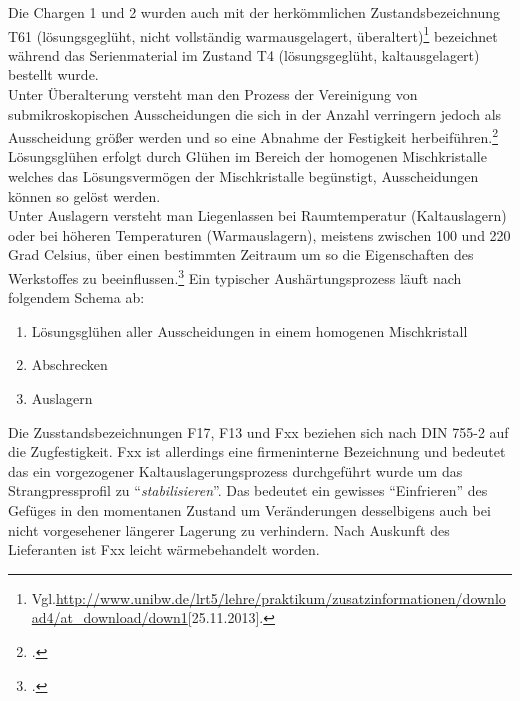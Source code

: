 \documentclass[12pt,a4paper,parskip]{scrartcl}
\begin{document}
 Die Chargen 1 und 2 wurden auch mit der herkömmlichen Zustandsbezeichnung T61 (lösungsgeglüht, nicht vollständig warmausgelagert, überaltert)\footnote{Vgl.\url{http://www.unibw.de/lrt5/lehre/praktikum/zusatzinformationen/download4/at_download/down1}[25.11.2013].} bezeichnet während das Serienmaterial im Zustand T4 (lösungsgeglüht, kaltausgelagert) bestellt wurde. \\
 Unter Überalterung versteht man  den Prozess der Vereinigung von  submikroskopischen Ausscheidungen die sich  in der Anzahl verringern jedoch als Ausscheidung größer werden und so eine Abnahme der Festigkeit herbeiführen.\footcite[Vgl.][52]{wki}\\
  Lösungsglühen erfolgt durch Glühen im Bereich der homogenen Mischkristalle welches das   Lösungsvermögen der Mischkristalle begünstigt, Ausscheidungen können so gelöst werden.\\
   Unter Auslagern versteht man Liegenlassen bei Raumtemperatur (Kaltauslagern) oder bei  höheren Temperaturen (Warmauslagern), meistens zwischen 100 und 220 Grad Celsius, über einen bestimmten Zeitraum um so die Eigenschaften des Werkstoffes zu beeinflussen.\footcite[Vgl.][213]{wk}
Ein typischer Aushärtungsprozess läuft nach folgendem Schema ab:

\begin{enumerate}
 \item Lösungsglühen aller Ausscheidungen in einem homogenen Mischkristall 
 \item Abschrecken
 \item Auslagern 
 \end{enumerate}
 
   
 
 

Die Zusstandsbezeichnungen F17, F13 und Fxx beziehen sich nach DIN 755-2 auf die Zugfestigkeit. Fxx ist allerdings eine firmeninterne Bezeichnung und bedeutet das ein  vorgezogener Kaltauslagerungsprozess durchgeführt wurde um das Strangpressprofil zu "`\emph{stabilisieren}"'. Das bedeutet ein gewisses "`Einfrieren"' des Gefüges in den momentanen Zustand um Veränderungen desselbigens auch bei nicht vorgesehener längerer Lagerung zu verhindern. Nach Auskunft des Lieferanten ist Fxx leicht wärmebehandelt worden.
\end{document}
